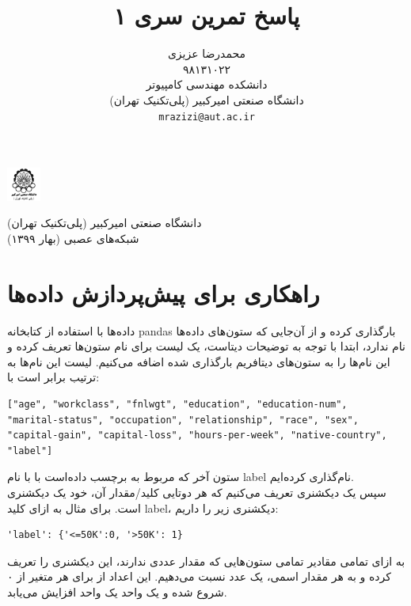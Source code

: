\documentclass{article}
\title{پاسخ تمرین سری ۱ }
\author{%
  محمدرضا عزیزی\\
  ۹۸۱۳۱۰۲۲ \\
  دانشکده مهندسی کامپیوتر\\
  دانشگاه صنعتی امیرکبیر (پلی‌تکنیک تهران)\\
  \texttt{mrazizi@aut.ac.ir} \\
}
\begin{document}
\begin{minipage}{0.1\textwidth}%
\includegraphics[width=1.1cm]{aut_logo.png}
\end{minipage}%
\hfill%
\begin{minipage}{0.9\textwidth}\raggedleft
دانشگاه صنعتی امیرکبیر (پلی‌تکنیک تهران)\\
شبکه‌های عصبی (بهار ۱۳۹۹)\\
\end{minipage}


\makepertitle




\section{
راهکاری برای پیش‌پردازش داده‌ها
}

داده‌ها با استفاده از کتابخانه pandas بارگذاری کرده و از آن‌جایی که ستون‌های داده‌ها نام ندارد، ابتدا با توجه به توضیحات دیتاست، یک لیست برای نام ستون‌ها تعریف کرده و این نام‌ها را به ستون‌های دیتافریم بارگذاری شده اضافه می‌کنیم. لیست این نام‌ها به ترتیب برابر است با:

\begin{latin}
\begin{lstlisting}
["age", "workclass", "fnlwgt", "education", "education-num", 
"marital-status", "occupation", "relationship", "race", "sex", 
"capital-gain", "capital-loss", "hours-per-week", "native-country", "label"]
\end{lstlisting}
\end{latin}

ستون آخر که مربوط به برچسب داده‌است با با نام label نام‌گذاری کرده‌ایم. \\


سپس یک دیکشنری تعریف می‌کنیم که هر دوتایی کلید/مقدار آن، خود یک دیکشنری است. برای مثال به ازای کلید label، دیکشنری زیر را داریم:

\begin{latin}
\begin{lstlisting}
'label': {'<=50K':0, '>50K': 1}
\end{lstlisting}
\end{latin}

به ازای تمامی مقادیر تمامی ستون‌هایی که مقدار عددی ندارند، این دیکشنری را تعریف کرده و به هر مقدار اسمی، یک عدد نسبت می‌دهیم. این اعداد از برای هر متغیر از ۰ شروع شده و یک واحد یک واحد افزایش می‌یابد. 
\end{document}
